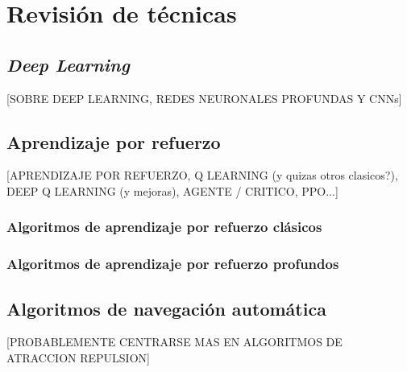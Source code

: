\chapter{Revisión de técnicas}

\section{\textit{Deep Learning}}
[SOBRE DEEP LEARNING, REDES NEURONALES PROFUNDAS Y CNNs]

\section{Aprendizaje por refuerzo}
[APRENDIZAJE POR REFUERZO, Q LEARNING (y quizas otros clasicos?), DEEP Q LEARNING (y mejoras), AGENTE / CRITICO, PPO...]

\subsection{Algoritmos de aprendizaje por refuerzo clásicos}

\subsection{Algoritmos de aprendizaje por refuerzo profundos}

\section{Algoritmos de navegación automática}
[PROBABLEMENTE CENTRARSE MAS EN ALGORITMOS DE ATRACCION REPULSION]